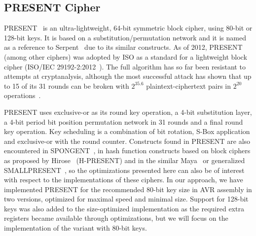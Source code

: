 \documentclass[11pt]{llncs2e} %
\begin{document}
\subsection{PRESENT Cipher}
 PRESENT~\cite{bogdanov2007present} is an ultra-lightweight, 64-bit symmetric block cipher, using 80-bit or 128-bit keys.
It is based on a substitution/permutation network and it is named as a reference to Serpent~\cite{anderson1998serpent} due to its similar constructs.
As of 2012, PRESENT (among other ciphers) was adopted by ISO as a standard for a lightweight block cipher (ISO/IEC 29192-2:2012~\cite{present_iso}). The full algorithm has so far been resistant to attempts at cryptanalysis, although the most successful attack has shown that up to 15 of its 31 rounds can be broken with $2^{35.6}$ plaintext-ciphertext pairs in $2^{20}$ operations~\cite{abed2012biclique,collard2009statistical,nakahara2009linear}.

PRESENT uses exclusive-or as its round key operation, a 4-bit substitution layer, a 4-bit period bit position permutation network in 31 rounds and a final round key operation.
Key scheduling is a combination of bit rotation, S-Box application and exclusive-or with the round counter.
Constructs found in PRESENT are also encountered in SPONGENT~\cite{bogdanov2011spongent}, in hash function constructs based on block ciphers as proposed by Hirose~\cite{bogdanov2008hash,hirose2005provably,hirose2006some} (H-PRESENT) and in the similar Maya~\cite{gomathisankaran2009maya} or generalized SMALLPRESENT~\cite{leander2010small}, so the optimizations presented here can also be of interest with respect to the implementations of these ciphers. In our approach, we have implemented PRESENT for the recommended 80-bit key size in AVR assembly in two versions, optimized for maximal speed and minimal size.
Support for 128-bit keys was also added to the size-optimized implementation as the required extra registers became available through optimizations, but we will focus on the implementation of the variant with 80-bit keys.
\end{document}
